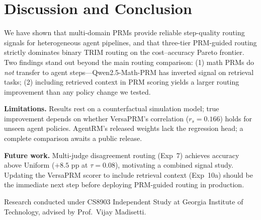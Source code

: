 \documentclass[sigconf,natbib=false]{acmart}
\begin{document}
\section{Discussion and Conclusion}

We have shown that multi-domain PRMs provide reliable step-quality routing
signals for heterogeneous agent pipelines, and that three-tier PRM-guided
routing strictly dominates binary TRIM routing on the cost--accuracy Pareto
frontier.  Two findings stand out beyond the main routing comparison: (1) math
PRMs do \emph{not} transfer to agent steps---Qwen2.5-Math-PRM has inverted
signal on retrieval tasks; (2) including retrieved context in PRM scoring
yields a larger routing improvement than any policy change we tested.

\textbf{Limitations.}  Results rest on a counterfactual simulation model; true
improvement depends on whether VersaPRM's correlation ($r_s = 0.166$) holds
for unseen agent policies.  AgentRM's released weights lack the regression
head; a complete comparison awaits a public release.

\textbf{Future work.}  Multi-judge disagreement routing (Exp~7) achieves
accuracy above Uniform ($+8.5$ pp at $\tau{=}0.08$), motivating a combined
signal study.  Updating the VersaPRM scorer to include retrieval context
(Exp~10a) should be the immediate next step before deploying PRM-guided
routing in production.

\begin{acks}
Research conducted under CS8903 Independent Study at Georgia Institute of
Technology, advised by Prof.\ Vijay Madisetti.
\end{acks}



\end{document}
